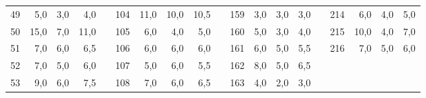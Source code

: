 \begin{table}[H]
{\begin{tabular}{|c|r|r|r|l|c|r|r|r|l|c|r|r|r|lcrrr}
49                                                    & 5,0                                                                       & 3,0                                                                       & 4,0                                                                       &  & 104 & 11,0 & 10,0 & 10,5 &  & 159 & 3,0  & 3,0  & 3,0  & \multicolumn{1}{l|}{} & \multicolumn{1}{c|}{214} & \multicolumn{1}{r|}{6,0}  & \multicolumn{1}{r|}{4,0}  & \multicolumn{1}{r|}{5,0}  \\ \cline{1-4} \cline{6-9} \cline{11-14} \cline{16-19} 
50                                                    & 15,0                                                                      & 7,0                                                                       & 11,0                                                                      &  & 105 & 6,0  & 4,0  & 5,0  &  & 160 & 5,0  & 3,0  & 4,0  & \multicolumn{1}{l|}{} & \multicolumn{1}{c|}{215} & \multicolumn{1}{r|}{10,0} & \multicolumn{1}{r|}{4,0}  & \multicolumn{1}{r|}{7,0}  \\ \cline{1-4} \cline{6-9} \cline{11-14} \cline{16-19} 
51                                                    & 7,0                                                                       & 6,0                                                                       & 6,5                                                                       &  & 106 & 6,0  & 6,0  & 6,0  &  & 161 & 6,0  & 5,0  & 5,5  & \multicolumn{1}{l|}{} & \multicolumn{1}{c|}{216} & \multicolumn{1}{r|}{7,0}  & \multicolumn{1}{r|}{5,0}  & \multicolumn{1}{r|}{6,0}  \\ \cline{1-4} \cline{6-9} \cline{11-14} \cline{16-19} 
52                                                    & 7,0                                                                       & 5,0                                                                       & 6,0                                                                       &  & 107 & 5,0  & 6,0  & 5,5  &  & 162 & 8,0  & 5,0  & 6,5  &                       & \multicolumn{1}{l}{}     & \multicolumn{1}{l}{}      & \multicolumn{1}{l}{}      & \multicolumn{1}{l}{}      \\ \cline{1-4} \cline{6-9} \cline{11-14}
53                                                    & 9,0                                                                       & 6,0                                                                       & 7,5                                                                       &  & 108 & 7,0  & 6,0  & 6,5  &  & 163 & 4,0  & 2,0  & 3,0  &                       & \multicolumn{1}{l}{}     & \multicolumn{1}{l}{}      & \multicolumn{1}{l}{}      & \multicolumn{1}{l}{}      \\ \cline{1-4} \cline{6-9} \cline{11-14}

\end{tabular}}
\end{table}
